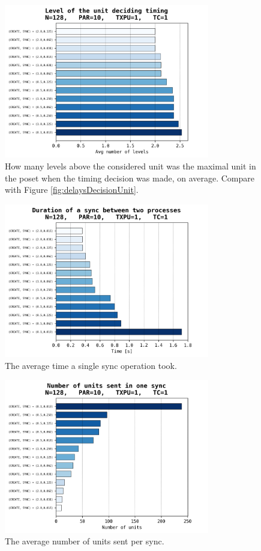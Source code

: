 \documentclass[a4paper,10pt]{article}
\begin{document}
			\begin{figure}[h]
				\centering
				\includegraphics[width=0.8\textwidth]{bar_plots/final_exp1/decision_height.png}
				\caption{How many levels above the considered unit was the maximal unit in the poset when the timing decision was made, on average. Compare with Figure \ref{fig:delaysDecisionUnit}.}
				\label{fig:delaysDecisionPoset}
			\end{figure}
			\begin{figure}[h]
				\centering
				\includegraphics[width=0.8\textwidth]{bar_plots/final_exp1/time_per_sync.png}
				\caption{The average time a single sync operation took.}
				\label{fig:delaysTimePerSync}
			\end{figure}
			\begin{figure}[h]
				\centering
				\includegraphics[width=0.8\textwidth]{bar_plots/final_exp1/units_sent_sync.png}
				\caption{The average number of units sent per sync.}
				\label{fig:delaysUnitsPerSync}
			\end{figure}
\end{document}
